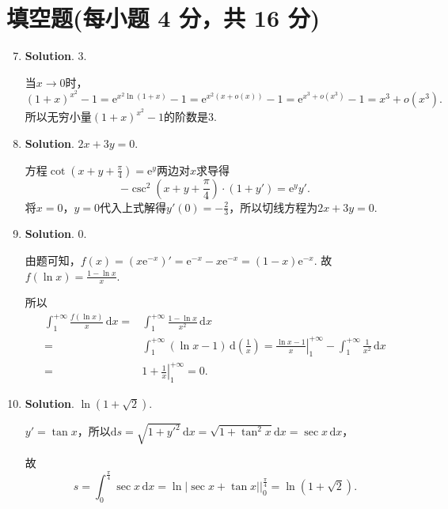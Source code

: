 \documentclass[../main.tex]{subfiles}
\begin{document}
\section{填空题(每小题 4 分，共 16 分)}
\begin{enumerate}
    \setcounter{enumi}{6}
    \item \textbf{Solution}. $3$.

          当$x\to0$时，
          \[
              \left(1+x\right)^{x^2}-1 = \mathrm{e}^{x^2\ln(1+x)}-1 = \mathrm{e}
              ^{x^2\left(x+o(x)\right)}-1= \mathrm{e}^{x^3+o(x^3)}-1 = x^{3}+o(x^{3}).
          \]
          所以无穷小量$\left(1+x\right)^{x^2}-1$的阶数是$3$.

    \item \textbf{Solution}. $2x+3y=0$.

          方程$\cot\left(x+y+\frac{\pi}{4}\right)=\mathrm{e}^{y}$两边对$x$求导得
          \[
              -\csc^{2}\left(x+y+\frac{\pi}{4}\right)\cdot\left(1+y'\right)=\mathrm{e}^{y}
              y'.
          \]
          将$x=0$，$y=0$代入上式解得$y'(0)=-\frac{2}{3}$，所以切线方程为$2x+3y=0$.

    \item \textbf{Solution}. $0$.

          由题可知，$f(x)=\left(x\mathrm{e}^{-x}\right)'=\mathrm{e}^{-x}-x\mathrm{e}^{-x}
              =(1-x)\mathrm{e}^{-x}$. 故$f(\ln x)=\frac{1-\ln x}{x}$.

          所以
          \[
              \begin{aligned}
                  \int_{1}^{+\infty}\frac{f(\ln x)}{x}\,\mathrm{d}x = {} & \int_{1}^{+\infty}\frac{1-\ln x}{x^2}\,\mathrm{d}x                                                                                                                    \\
                  = {}                                                   & \int_{1}^{+\infty}\left(\ln x-1\right)\,\mathrm{d}\left(\frac{1}{x}\right)= \left.\frac{\ln x-1}{x}\right|_{1}^{+\infty}-\int_{1}^{+\infty}\frac{1}{x^2}\,\mathrm{d}x \\
                  = {}                                                   & 1+\left.\frac{1}{x}\right|_{1}^{+\infty}= 0.
              \end{aligned}
          \]

    \item \textbf{Solution}. $\ln\left(1+\sqrt{2}\right)$.

          $y'=\tan x$，所以$\mathrm{d}s=\sqrt{1+y'^{2}}\,\mathrm{d}x=\sqrt{1+\tan^{2} x}
              \mathrm{d}x=\sec x\,\mathrm{d}x$，

          故
          \[
              s=\int_{0}^{\frac{\pi}{4}}\sec x\,\mathrm{d}x=\ln\left|\sec x+\tan x\right
              |\bigg|_{0}^{\frac{\pi}{4}}=\ln\left(1+\sqrt{2}\right).
          \]
\end{enumerate}
\end{document}
